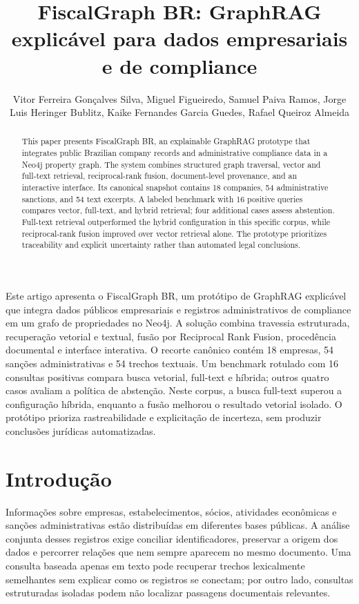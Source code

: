 \documentclass[12pt]{article}
\title{FiscalGraph BR: GraphRAG explicável para dados empresariais e de compliance}
\author{Vitor Ferreira Gonçalves Silva, Miguel Figueiredo, Samuel Paiva Ramos, Jorge Luis Heringer Bublitz, Kaike Fernandes Garcia Guedes, Rafael Queiroz Almeida}
\begin{document}
\maketitle

\begin{abstract}
This paper presents FiscalGraph BR, an explainable GraphRAG prototype that integrates public Brazilian company records and administrative compliance data in a Neo4j property graph. The system combines structured graph traversal, vector and full-text retrieval, reciprocal-rank fusion, document-level provenance, and an interactive interface. Its canonical snapshot contains 18 companies, 54 administrative sanctions, and 54 text excerpts. A labeled benchmark with 16 positive queries compares vector, full-text, and hybrid retrieval; four additional cases assess abstention. Full-text retrieval outperformed the hybrid configuration in this specific corpus, while reciprocal-rank fusion improved over vector retrieval alone. The prototype prioritizes traceability and explicit uncertainty rather than automated legal conclusions.
\end{abstract}

\begin{resumo}
Este artigo apresenta o FiscalGraph BR, um protótipo de GraphRAG explicável que integra dados públicos empresariais e registros administrativos de compliance em um grafo de propriedades no Neo4j. A solução combina travessia estruturada, recuperação vetorial e textual, fusão por Reciprocal Rank Fusion, procedência documental e interface interativa. O recorte canônico contém 18 empresas, 54 sanções administrativas e 54 trechos textuais. Um benchmark rotulado com 16 consultas positivas compara busca vetorial, full-text e híbrida; outros quatro casos avaliam a política de abstenção. Neste corpus, a busca full-text superou a configuração híbrida, enquanto a fusão melhorou o resultado vetorial isolado. O protótipo prioriza rastreabilidade e explicitação de incerteza, sem produzir conclusões jurídicas automatizadas.
\end{resumo}

\section{Introdução}

Informações sobre empresas, estabelecimentos, sócios, atividades econômicas e sanções administrativas estão distribuídas em diferentes bases públicas. A análise conjunta desses registros exige conciliar identificadores, preservar a origem dos dados e percorrer relações que nem sempre aparecem no mesmo documento. Uma consulta baseada apenas em texto pode recuperar trechos lexicalmente semelhantes sem explicar como os registros se conectam; por outro lado, consultas estruturadas isoladas podem não localizar passagens documentais relevantes.
\end{document}
